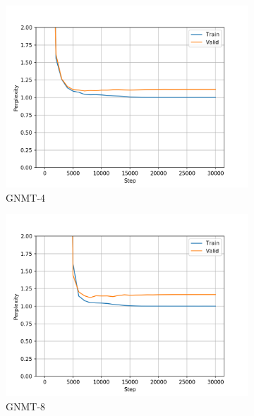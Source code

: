 \begin{figure}[h]
\begin{subfigure}{0.3\textwidth}
\includegraphics[width=\textwidth]{../results/monument_600/run1/wmt16_gnmt_4_layer/ppls.png} 
\caption{GNMT-4}
\label{fig:monu600 gnmt4 ppl}
\end{subfigure}
\hfill
\begin{subfigure}{0.3\textwidth}
\includegraphics[width=\textwidth]{../results/monument_600/run1/wmt16_gnmt_8_layer/ppls.png}
\caption{GNMT-8}
\label{fig:monu600 gnmt8 ppl}
\end{subfigure}
\hfill
\begin{subfigure}{0.3\textwidth}

\end{subfigure}
\end{figure}
